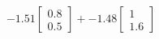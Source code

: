 \documentclass[preview]{standalone}
\begin{document}
\begin{align*}
-1.51 \begin{bmatrix} 0.8 \\ 0.5 \end{bmatrix} + -1.48 \begin{bmatrix} 1 \\ 1.6 \end{bmatrix}
\end{align*}
\end{document}
